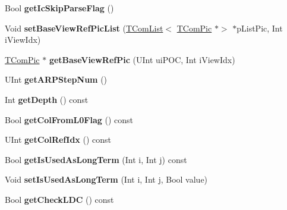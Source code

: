 \begin{DoxyCompactItemize}
\item 
\mbox{\label{class_t_com_slice_ab79e2825f0af1aa3e3c3c8c5c7a55ca8}} 
Bool {\bfseries get\+Ic\+Skip\+Parse\+Flag} ()
\item 
\mbox{\label{class_t_com_slice_a989b5c880ae33fa818b508aa4d7b9b14}} 
Void {\bfseries set\+Base\+View\+Ref\+Pic\+List} (\hyperlink{class_t_com_list}{T\+Com\+List}$<$ \hyperlink{class_t_com_pic}{T\+Com\+Pic} $\ast$$>$ $\ast$p\+List\+Pic, Int i\+View\+Idx)
\item 
\mbox{\label{class_t_com_slice_a8787f01bf0f0d9d2c21d83c454a4f387}} 
\hyperlink{class_t_com_pic}{T\+Com\+Pic} $\ast$ {\bfseries get\+Base\+View\+Ref\+Pic} (U\+Int ui\+P\+OC, Int i\+View\+Idx)
\item 
\mbox{\label{class_t_com_slice_a58c2f85802fc5518046e32a75e908bf2}} 
U\+Int {\bfseries get\+A\+R\+P\+Step\+Num} ()
\item 
\mbox{\label{class_t_com_slice_ae96044715ff8fed6b447e4558ce7328d}} 
Int {\bfseries get\+Depth} () const
\item 
\mbox{\label{class_t_com_slice_a4ec637e901e06021b31d9624ae95b91d}} 
Bool {\bfseries get\+Col\+From\+L0\+Flag} () const
\item 
\mbox{\label{class_t_com_slice_ab655564f2e599891f02834028e70921e}} 
U\+Int {\bfseries get\+Col\+Ref\+Idx} () const
\item 
\mbox{\label{class_t_com_slice_a17fefe469255062aa0be556d6a005e62}} 
Bool {\bfseries get\+Is\+Used\+As\+Long\+Term} (Int i, Int j) const
\item 
\mbox{\label{class_t_com_slice_a81de2e17beeb5cf1ac7420baeae42c6d}} 
Void {\bfseries set\+Is\+Used\+As\+Long\+Term} (Int i, Int j, Bool value)
\item 
\mbox{\label{class_t_com_slice_a637234d9069b59736787e49d5fa18ea5}} 
Bool {\bfseries get\+Check\+L\+DC} () const
\item 
\mbox{\label{class_t_com_slice_ab0778954ef4926d7e67779bbaaea1f2a}} 
$$
\end{DoxyCompactItemize}
